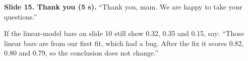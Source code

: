 \textbf{Slide 15. Thank you (5 s).}  ``Thank you, mam. We are happy to take your questions.''

\begin{carefulbox}
If the linear-model bars on slide 10 still show 0.32, 0.35 and 0.15, say: ``Those linear bars are from our first fit, which had a bug. After the fix it scores 0.82, 0.80 and 0.79, so the conclusion does not change.''
\end{carefulbox}
